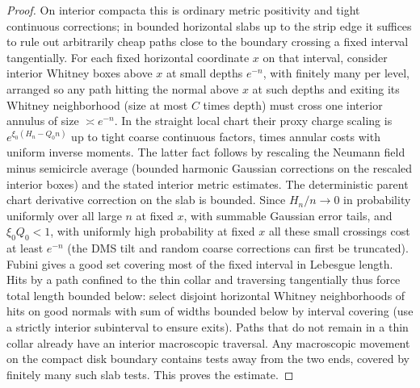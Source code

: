 \begin{proof}
On interior compacta this is ordinary metric positivity and tight continuous corrections; in bounded horizontal slabs up to the strip edge it suffices to rule out arbitrarily cheap paths close to the boundary crossing a fixed interval tangentially.
For each fixed horizontal coordinate \(x\) on that interval, consider interior Whitney boxes above \(x\) at small depths \(e^{-n}\), with finitely many per level, arranged so any path hitting the normal above \(x\) at such depths and exiting its Whitney neighborhood (size at most \(C\) times depth) must cross one interior annulus of size \(\asymp e^{-n}\).
In the straight local chart their proxy charge scaling is \(e^{\xi_0(H_n-Q_0 n)}\) up to tight coarse continuous factors, times annular costs with uniform inverse moments.
The latter fact follows by rescaling the Neumann field minus semicircle average (bounded harmonic Gaussian corrections on the rescaled interior boxes) and the stated interior metric estimates.
The deterministic parent chart derivative correction on the slab is bounded.
Since \(H_n/n\to0\) in probability uniformly over all large \(n\) at fixed \(x\), with summable Gaussian error tails, and \(\xi_0Q_0<1\), with uniformly high probability at fixed \(x\) all these small crossings cost at least \(e^{-n}\) (the DMS tilt and random coarse corrections can first be truncated).
Fubini gives a good set covering most of the fixed interval in Lebesgue length.
Hits by a path confined to the thin collar and traversing tangentially thus force total length bounded below: select disjoint horizontal Whitney neighborhoods of hits on good normals with sum of widths bounded below by interval covering (use a strictly interior subinterval to ensure exits).
Paths that do not remain in a thin collar already have an interior macroscopic traversal.
Any macroscopic movement on the compact disk boundary contains tests away from the two ends, covered by finitely many such slab tests.
This proves the estimate.

\end{proof}

